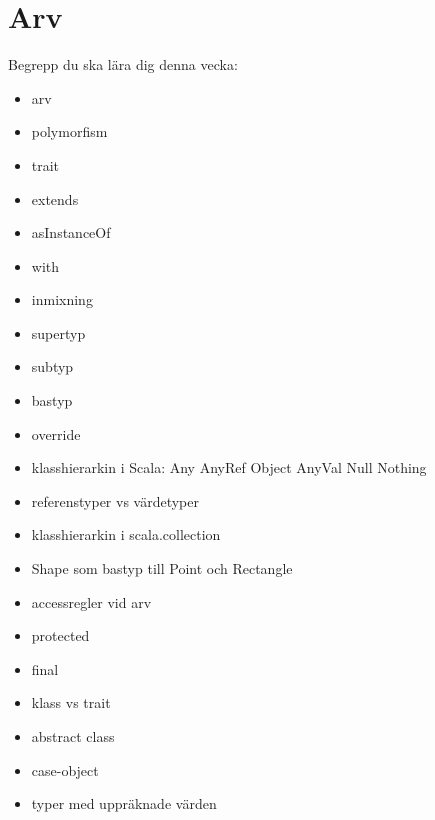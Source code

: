 \chapter{Arv}\label{chapter:W07}
Begrepp du ska lära dig denna vecka:
\begin{itemize}[noitemsep,label={$\square$},leftmargin=*]
\item arv
\item polymorfism
\item trait
\item extends
\item asInstanceOf
\item with
\item inmixning
\item supertyp
\item subtyp
\item bastyp
\item override
\item klasshierarkin i Scala: Any AnyRef Object AnyVal Null Nothing
\item referenstyper vs värdetyper
\item klasshierarkin i scala.collection
\item Shape som bastyp till Point och Rectangle
\item accessregler vid arv
\item protected
\item final
\item klass vs trait
\item abstract class
\item case-object
\item typer med uppräknade värden\end{itemize}
